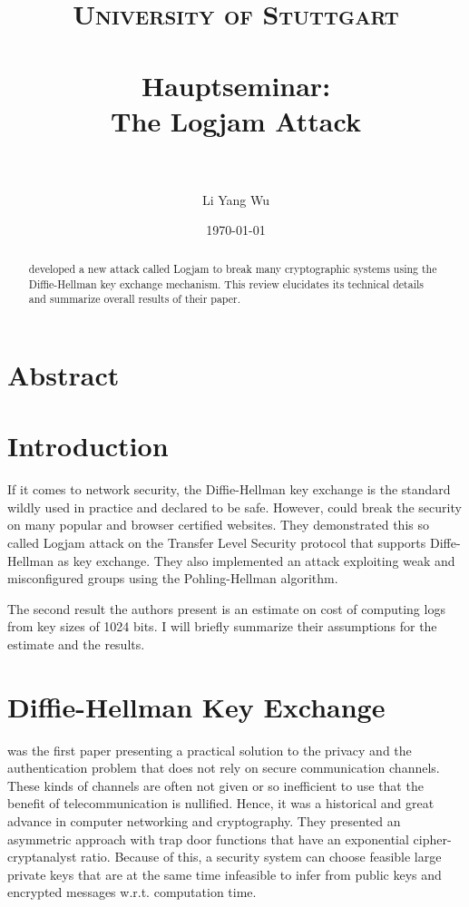 \documentclass[paper=a4, fontsize=11pt]{scrartcl} %
\title{	
\normalfont \normalsize 
\textsc{University of Stuttgart} \\ [25pt] %
\horrule{0.5pt} \\[0.4cm] %
\huge Hauptseminar:\\The Logjam Attack \\ %
\horrule{2pt} \\[0.5cm] %
}
\author{Li Yang Wu} %
\date{\normalsize\today} %
\numberwithin{equation}{section} %
\numberwithin{figure}{section} %
\numberwithin{table}{section} %
\begin{document}
\maketitle %

\tableofcontents

\newpage

\section*{Abstract}
\begin{abstract}
\citep{Adrian:2015:IFS:2810103.2813707} developed a new attack called Logjam to break many cryptographic systems using the Diffie-Hellman key exchange mechanism. This review elucidates its technical details and summarize overall results of their paper.
\end{abstract}
\section{Introduction}
If it comes to network security, the Diffie-Hellman key exchange is the standard wildly used in practice and declared to be safe. However, \citep{Adrian:2015:IFS:2810103.2813707} could break the security on many popular and browser certified websites. They demonstrated this so called Logjam attack on the Transfer Level Security protocol that supports Diffe-Hellman as key exchange. They also implemented an attack exploiting weak and misconfigured groups using the Pohling-Hellman algorithm.

The second result the authors present is an estimate on cost of computing logs from key sizes of 1024 bits. I will briefly summarize their assumptions for the estimate and the results.
\section{Diffie-Hellman Key Exchange}
\citep{diffie1976new} was the first paper presenting a practical solution to the privacy and the authentication problem that does not rely on secure communication channels. These kinds of channels are often not given or so inefficient to use that the benefit of telecommunication is nullified. Hence, it was a historical and great advance in computer networking and cryptography. They presented an asymmetric approach with trap door functions that have an exponential cipher-cryptanalyst ratio. Because of this, a security system can choose feasible large private keys that are at the same time infeasible to infer from public keys and encrypted messages w.r.t. computation time.
\end{document}
